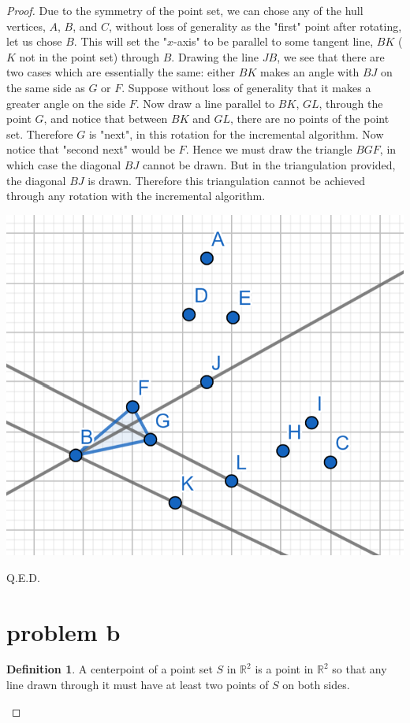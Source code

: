 \documentclass[12pt]{article}
\newcommand{\R}{\mathbb{R}}
\theoremstyle{definition}
\newtheorem*{definition}{Definition}
\begin{document}
\begin{proof}
Due to the symmetry of the point set, we can chose any of the hull vertices, $A$, $B$, and $C$, without loss of generality as the "first" point after rotating, let us chose $B$. This will set the "$x$-axis" to be parallel to some tangent line, $BK$ ($K$ not in the point set) through $B$. Drawing the line $JB$, we see that there are two cases which are essentially the same: either $BK$ makes an angle with $BJ$ on the same side as $G$ or $F$. Suppose without loss of generality that it makes a greater angle on the side $F$. Now draw a line parallel to $BK$, $GL$, through the point $G$, and notice that between $BK$ and $GL$, there are no points of the point set. Therefore $G$ is "next", in this rotation for the incremental algorithm. Now notice that "second next" would be $F$. Hence we must draw the triangle $BGF$, in which case the diagonal $BJ$ cannot be drawn. But in the triangulation provided, the diagonal $BJ$ is drawn. Therefore this triangulation cannot be achieved through any rotation with the incremental algorithm. 

\includegraphics[scale=1]{proof_counterexample.png} 

Q.E.D.


\section{problem b}

\begin{definition}
A centerpoint of a point set $S$ in $\R^2$ is a point in $\R^2$ so that any line drawn through it must have at least two points of $S$ on both sides.
\end{definition}



\end{proof}
\end{document}
